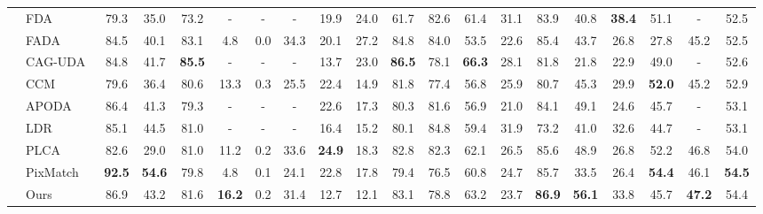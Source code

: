 \documentclass[runningheads]{llncs}
\begin{document}
\begin{table*}[htbp]
\begin{center}
{\begin{tabular}{c|l c c c c c c c c c c c c c c c c|c|c}
                &FDA~\cite{yang2020fda} &  79.3 & 35.0 & 73.2 & - & - &  - &  19.9 &  24.0 & 61.7 & 82.6 &  61.4 &  31.1 &  83.9 & 40.8 & \bf 38.4 & 51.1 & - &52.5 \\
                &FADA~\cite{wang2020class} & 84.5 & 40.1 & 83.1 & 4.8 & 0.0 & 34.3 & 20.1 & 27.2 & 84.8 & 84.0 & 53.5 & 22.6 & 85.4 & 43.7 & 26.8 & 27.8 & 45.2 & 52.5 \\ &CAG-UDA~\cite{zhang2019category} & 84.8 & 41.7 & \bf 85.5 & - & - & - & 13.7 & 23.0 & \bf 86.5 & 78.1 & \bf 66.3 & 28.1 & 81.8 & 21.8 & 22.9 & 49.0 & - & 52.6 \\
                & CCM~\cite{li2020content} & 79.6 & 36.4 & 80.6 & 13.3 & 0.3 & 25.5 & 22.4 & 14.9 & 81.8 & 77.4 & 56.8 & 25.9 & 80.7 & 45.3 & 29.9 & \bf 52.0 & 45.2 & 52.9 \\
                &APODA~\cite{YangXLQSLL20} & 86.4 & 41.3 & 79.3 & - &- & - & 22.6 & 17.3 & 80.3 & 81.6 & 56.9 & 21.0 & 84.1 & 49.1 & 24.6 & 45.7 & - & 53.1 \\
                & LDR~\cite{yang2020label-driven} & 85.1 & 44.5 & 81.0 & - & - & -&16.4&15.2&80.1&84.8&59.4&31.9&73.2&41.0&32.6&44.7&- &53.1 \\
                &PLCA~\cite{kang2020pixel} & 82.6 & 29.0 & 81.0 & 11.2 & 0.2 & 33.6 & \bf 24.9 & 18.3 & 82.8 & 82.3 & 62.1 & 26.5 & 85.6 & 48.9 & 26.8 & 52.2 & 46.8 & 54.0 \\
                & PixMatch~\cite{pixmatch2021_CVPR} & \bf 92.5 & \bf 54.6 & 79.8 & 4.8 & 0.1 & 24.1 & 22.8 & 17.8 & 79.4 & 76.5 & 60.8 & 24.7 & 85.7 & 33.5 & 26.4 & \bf 54.4 & 46.1 & \bf 54.5 \\
                &\cellcolor{Gray}Ours & \cellcolor{Gray}86.9 & \cellcolor{Gray}43.2 & \cellcolor{Gray}81.6 & \cellcolor{Gray}\bf 16.2 & \cellcolor{Gray}0.2 & \cellcolor{Gray}31.4 & \cellcolor{Gray}12.7 & \cellcolor{Gray}12.1 & \cellcolor{Gray}83.1 & \cellcolor{Gray}78.8 & \cellcolor{Gray}63.2 & \cellcolor{Gray}23.7 & \cellcolor{Gray}\bf 86.9 & \cellcolor{Gray}\bf 56.1 & \cellcolor{Gray}33.8 & \cellcolor{Gray}45.7 & \cellcolor{Gray}\bf 47.2 & \cellcolor{Gray} 54.4 \\
                \bottomrule[1.2pt]
                \end{tabular}
        } 
        \vspace{-6mm}
    \end{center}
\end{table*}
\end{document}

